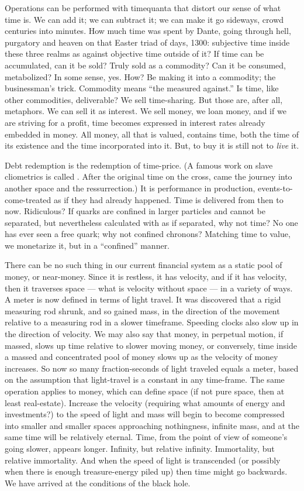 Operations can be performed with timequanta that distort our sense of what time is. We can add it; we can subtract it; we can make it go sideways, crowd centuries into minutes. How much time was spent by Dante, going through hell, purgatory and heaven on that Easter triad of days, 1300: subjective time inside these three realms as against objective time outside of it? If time can be accumulated, can it be sold? Truly sold as a commodity? Can it be consumed, metabolized? In some sense, yes. How? Be %
making it into a commodity; the businessman's trick. Commodity means \enquote{the measured against.} Is time, like other commodities, deliverable? We sell time-sharing. But those are, after all, metaphors. We can sell it as interest. We sell money, we loan money, and if we are striving for a profit, time becomes expressed in interest rates already embedded in money. All money, all that is valued, contains time, both the time of its existence and the time incorporated into it. But, to buy it is still not to \emph{live} it.

Debt redemption is the redemption of time-price. (A famous work on slave cliometrics is called . After the original time on the cross, came the journey into another space and the ressurrection.) It is performance in production, events-to-come-treated as if they had already happened. Time is delivered from then to now. Ridiculous? If quarks are confined in larger particles and cannot be separated, but nevertheless calculated with as if separated, why not time? No one has ever seen a free quark; why not confined chronons? Matching time to value, we monetarize it, but in a \enquote{confined} manner.

There can be no such thing in our current financial system as a static pool of money, or near-money. Since it is restless, it has velocity, and if it has velocity, then it traverses space --- what is velocity without space --- in a variety of ways. A meter is now defined in terms of light travel. It was discovered that a rigid measuring rod shrunk, and so gained mass, in the direction of the movement relative to a measuring rod in a slower timeframe. Speeding clocks also slow up in the direction of velocity. We may also say that money, in perpetual motion, if massed, slows up time relative to slower moving money, or conversely, time inside a massed and concentrated pool of money slows up as the velocity of money increases. So now so many fraction-seconds of light traveled equals a meter, based on the assumption that light-travel is a constant in any time-frame. The same operation applies to money, which can define space (if not pure space, then at least real-estate). Increase the velocity (requiring what amounts of energy and investments?) to the speed of light and mass will begin to become compressed into smaller and smaller spaces approaching nothingness, infinite mass, and at the same time will be relatively eternal. Time, from the point of view of someone's going slower, appears longer. Infinity, but relative infinity. Immortality, but relative immortality. And when the speed of light is transcended (or possibly when there is enough treasure-energy piled up) then time might go backwards. We have arrived at the conditions of the black hole.

